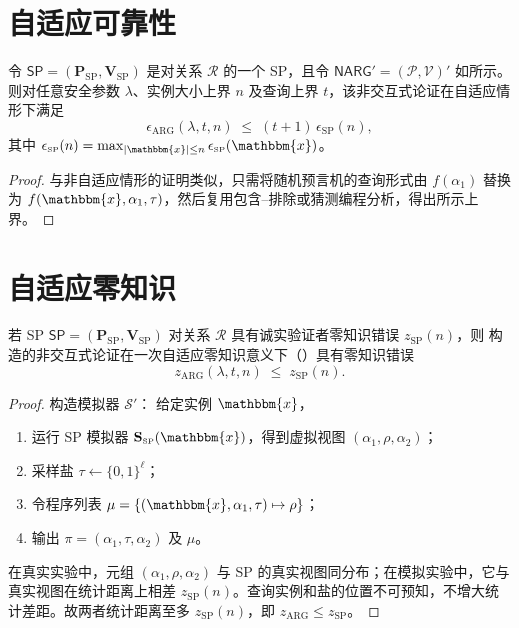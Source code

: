 \documentclass[american,singlepageview]{snargs-book-zh}
\newcommand{\Bits}{\{0,1\}}
\newcommand{\Relation}{\mathcal{R}}
\newcommand{\Instance}{\mathbbm{x}}
\newcommand{\InstanceSize}{n}
\newcommand{\ProtoProver}{P}
\newcommand{\ProtoVerifier}{V}
\newcommand{\ProtoSimulator}{S}
\newcommand{\ProtoSoundnessError}{\epsilon}
\newcommand{\ProtoZKError}{z}
\newcommand{\SPSymbol}{\mathsf{SP}}
\newcommand{\SPSubscript}{\scriptscriptstyle\mathrm{SP}}
\newcommand{\SPFormat}[1]{\mathbf{#1}}
\newcommand{\SPProver}{\SPFormat{\ProtoProver}_{\SPSubscript}}
\newcommand{\SPVerifier}{\SPFormat{\ProtoVerifier}_{\SPSubscript}}
\newcommand{\SPSimulator}{\SPFormat{\ProtoSimulator}_{\SPSubscript}}
\newcommand{\SPSoundnessError}{\ProtoSoundnessError_{\SPSubscript}}
\newcommand{\SPZKError}{\ProtoZKError_{\SPSubscript}}
\newcommand{\SPSystem}{(\SPProver,\SPVerifier)}
\newcommand{\SPCommitment}{\alpha_{1}}
\newcommand{\SPChallenge}{\rho}
\newcommand{\SPResponse}{\alpha_{2}}
\newcommand{\NARGSymbol}{\mathsf{NARG}}
\newcommand{\ARGSubscript}{\scriptscriptstyle\mathrm{ARG}}
\newcommand{\ARGFormat}[1]{\mathcal{#1}}
\newcommand{\ARGProver}{\ARGFormat{\ProtoProver}}
\newcommand{\ARGVerifier}{\ARGFormat{\ProtoVerifier}}
\newcommand{\ARGSystem}{(\ARGProver,\ARGVerifier)}
\newcommand{\ARGSimulator}{\ARGFormat{\ProtoSimulator}}
\newcommand{\ARGString}{\pi}
\newcommand{\ARGSoundnessError}{\ProtoSoundnessError_{\ARGSubscript}}
\newcommand{\ARGZKError}{\ProtoZKError_{\ARGSubscript}}
\newcommand{\ARGZKProgrammedList}{\ProgrammedList}
\newcommand{\ROFunction}{f}
\newcommand{\ROQueryBound}{t}
\newcommand{\SecurityParameter}{\lambda}
\newcommand{\ProgrammedList}{\mu}
\newcommand{\RandSalt}{\tau}
\newcommand{\SaltLength}{\ell}
\begin{document}
\section{自适应可靠性}
\label{section:narg-from-sp-adaptive-soundness}

\begin{lemma}
\label{lemma:narg-from-sp-adaptive-soundness}
令 $\SPSymbol=\SPSystem$ 是对关系 $\Relation$ 的一个 SP，且令
$\NARGSymbol'=\ARGSystem'$ 如所示。则对任意安全参数 $\SecurityParameter$、实例大小上界 $\InstanceSize$ 及查询上界 $\ROQueryBound$，该非交互式论证在自适应情形下满足
\[
  \ARGSoundnessError(\SecurityParameter,\ROQueryBound,\InstanceSize)
  \;\le\;
  (\ROQueryBound+1)\,\SPSoundnessError(\InstanceSize),
\]
其中 $\SPSoundnessError(\InstanceSize)=\max_{|\Instance|\le\InstanceSize}\SPSoundnessError(\Instance)$。
\end{lemma}

\begin{proof}
与非自适应情形的证明类似，只需将随机预言机的查询形式由
\(\ROFunction(\SPCommitment)\)
替换为
\(\ROFunction(\Instance,\SPCommitment,\RandSalt)\)，然后复用包含–排除或猜测编程分析，得出所示上界。
\end{proof}


\section{自适应零知识}
\label{section:narg-from-sp-zero-knowledge}

\begin{lemma}
\label{lemma:narg-from-sp-zero-knowledge}
若 SP $\SPSymbol=\SPSystem$ 对关系 $\Relation$ 具有诚实验证者零知识错误 $\SPZKError(\InstanceSize)$，则
 构造的非交互式论证在一次自适应零知识意义下（）具有零知识错误
\[
  \ARGZKError(\SecurityParameter,\ROQueryBound,\InstanceSize)
  \;\le\;
  \SPZKError(\InstanceSize).
\]
\end{lemma}

\begin{proof}
构造模拟器 $\ARGSimulator'$：  
给定实例 $\Instance$，
\begin{enumerate}[nosep]
  \item 运行 SP 模拟器 $\SPSimulator(\Instance)$，得到虚拟视图
    \((\SPCommitment,\SPChallenge,\SPResponse)\)；
  \item 采样盐 \(\RandSalt\gets\Bits^{\SaltLength}\)；
  \item 令程序列表
    \(\ARGZKProgrammedList=\{(\Instance,\SPCommitment,\RandSalt)\mapsto\SPChallenge\}\)；
  \item 输出 \(\ARGString=(\SPCommitment,\RandSalt,\SPResponse)\) 及
    \(\ARGZKProgrammedList\)。
\end{enumerate}
在真实实验中，元组
\((\SPCommitment,\SPChallenge,\SPResponse)\)
与 SP 的真实视图同分布；在模拟实验中，它与真实视图在统计距离上相差
$\SPZKError(\InstanceSize)$。查询实例和盐的位置不可预知，不增大统计差距。故两者统计距离至多 $\SPZKError(\InstanceSize)$，即
$\ARGZKError\le\SPZKError$。
\end{proof}
\end{document}
